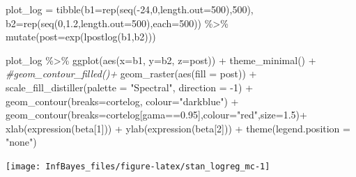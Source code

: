 \documentclass[
]{book}
\newenvironment{Shaded}{\begin{snugshade}}{\end{snugshade}}
\newcommand{\AttributeTok}[1]{\textcolor[rgb]{0.77,0.63,0.00}{#1}}
\newcommand{\CommentTok}[1]{\textcolor[rgb]{0.56,0.35,0.01}{\textit{#1}}}
\newcommand{\DecValTok}[1]{\textcolor[rgb]{0.00,0.00,0.81}{#1}}
\newcommand{\FloatTok}[1]{\textcolor[rgb]{0.00,0.00,0.81}{#1}}
\newcommand{\FunctionTok}[1]{\textcolor[rgb]{0.00,0.00,0.00}{#1}}
\newcommand{\NormalTok}[1]{#1}
\newcommand{\OtherTok}[1]{\textcolor[rgb]{0.56,0.35,0.01}{#1}}
\newcommand{\SpecialCharTok}[1]{\textcolor[rgb]{0.00,0.00,0.00}{#1}}
\newcommand{\StringTok}[1]{\textcolor[rgb]{0.31,0.60,0.02}{#1}}
\begin{document}
\begin{Shaded}
\begin{Highlighting}[]
\NormalTok{plot\_log }\OtherTok{=} \FunctionTok{tibble}\NormalTok{(}\AttributeTok{b1=}\FunctionTok{rep}\NormalTok{(}\FunctionTok{seq}\NormalTok{(}\SpecialCharTok{{-}}\DecValTok{24}\NormalTok{,}\DecValTok{0}\NormalTok{,}\AttributeTok{length.out=}\DecValTok{500}\NormalTok{),}\DecValTok{500}\NormalTok{),}
                  \AttributeTok{b2=}\FunctionTok{rep}\NormalTok{(}\FunctionTok{seq}\NormalTok{(}\DecValTok{0}\NormalTok{,}\FloatTok{1.2}\NormalTok{,}\AttributeTok{length.out=}\DecValTok{500}\NormalTok{),}\AttributeTok{each=}\DecValTok{500}\NormalTok{)) }\SpecialCharTok{\%\textgreater{}\%} 
                  \FunctionTok{mutate}\NormalTok{(}\AttributeTok{post=}\FunctionTok{exp}\NormalTok{(}\FunctionTok{lpostlog}\NormalTok{(b1,b2)))}

\NormalTok{plot\_log }\SpecialCharTok{\%\textgreater{}\%} 
  \FunctionTok{ggplot}\NormalTok{(}\FunctionTok{aes}\NormalTok{(}\AttributeTok{x=}\NormalTok{b1, }\AttributeTok{y=}\NormalTok{b2, }\AttributeTok{z=}\NormalTok{post)) }\SpecialCharTok{+} \FunctionTok{theme\_minimal}\NormalTok{() }\SpecialCharTok{+}
  \CommentTok{\#geom\_contour\_filled()+}
  \FunctionTok{geom\_raster}\NormalTok{(}\FunctionTok{aes}\NormalTok{(}\AttributeTok{fill =}\NormalTok{ post)) }\SpecialCharTok{+}
  \FunctionTok{scale\_fill\_distiller}\NormalTok{(}\AttributeTok{palette =} \StringTok{"Spectral"}\NormalTok{, }\AttributeTok{direction =} \SpecialCharTok{{-}}\DecValTok{1}\NormalTok{) }\SpecialCharTok{+}
  \FunctionTok{geom\_contour}\NormalTok{(}\AttributeTok{breaks=}\NormalTok{cortelog, }\AttributeTok{colour=}\StringTok{"darkblue"}\NormalTok{) }\SpecialCharTok{+} 
  \FunctionTok{geom\_contour}\NormalTok{(}\AttributeTok{breaks=}\NormalTok{cortelog[gama}\SpecialCharTok{==}\FloatTok{0.95}\NormalTok{],}\AttributeTok{colour=}\StringTok{"red"}\NormalTok{,}\AttributeTok{size=}\FloatTok{1.5}\NormalTok{)}\SpecialCharTok{+}
  \FunctionTok{xlab}\NormalTok{(}\FunctionTok{expression}\NormalTok{(beta[}\DecValTok{1}\NormalTok{])) }\SpecialCharTok{+} \FunctionTok{ylab}\NormalTok{(}\FunctionTok{expression}\NormalTok{(beta[}\DecValTok{2}\NormalTok{])) }\SpecialCharTok{+}
  \FunctionTok{theme}\NormalTok{(}\AttributeTok{legend.position =} \StringTok{"none"}\NormalTok{)}
\end{Highlighting}
\end{Shaded}

\begin{center}\texttt{[image: InfBayes\_files/figure-latex/stan\_logreg\_mc-1]} \end{center}
\end{document}
